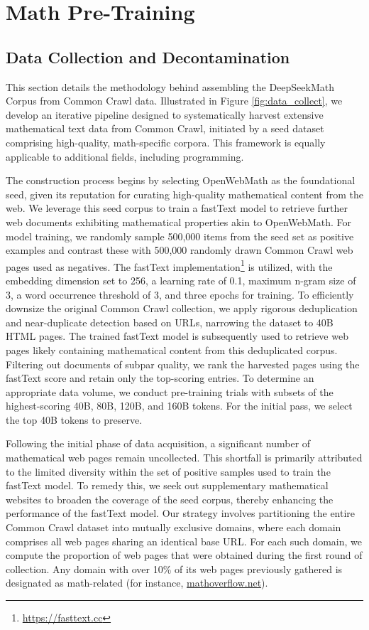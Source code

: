 \section{Math Pre-Training}

\subsection{Data Collection and Decontamination} This section details the methodology behind assembling the DeepSeekMath Corpus from Common Crawl data. Illustrated in Figure \ref{fig:data_collect}, we develop an iterative pipeline designed to systematically harvest extensive mathematical text data from Common Crawl, initiated by a seed dataset comprising high-quality, math-specific corpora. This framework is equally applicable to additional fields, including programming.

The construction process begins by selecting OpenWebMath \citep{openwebmath} as the foundational seed, given its reputation for curating high-quality mathematical content from the web. We leverage this seed corpus to train a fastText model \citep{joulin2016fasttext} to retrieve further web documents exhibiting mathematical properties akin to OpenWebMath. For model training, we randomly sample 500,000 items from the seed set as positive examples and contrast these with 500,000 randomly drawn Common Crawl web pages used as negatives. The fastText implementation\footnote{\url{https://fasttext.cc}} is utilized, with the embedding dimension set to 256, a learning rate of 0.1, maximum n-gram size of 3, a word occurrence threshold of 3, and three epochs for training. To efficiently downsize the original Common Crawl collection, we apply rigorous deduplication and near-duplicate detection based on URLs, narrowing the dataset to 40B HTML pages. The trained fastText model is subsequently used to retrieve web pages likely containing mathematical content from this deduplicated corpus. Filtering out documents of subpar quality, we rank the harvested pages using the fastText score and retain only the top-scoring entries. To determine an appropriate data volume, we conduct pre-training trials with subsets of the highest-scoring 40B, 80B, 120B, and 160B tokens. For the initial pass, we select the top 40B tokens to preserve.

Following the initial phase of data acquisition, a significant number of mathematical web pages remain uncollected. This shortfall is primarily attributed to the limited diversity within the set of positive samples used to train the fastText model. To remedy this, we seek out supplementary mathematical websites to broaden the coverage of the seed corpus, thereby enhancing the performance of the fastText model. Our strategy involves partitioning the entire Common Crawl dataset into mutually exclusive domains, where each domain comprises all web pages sharing an identical base URL. For each such domain, we compute the proportion of web pages that were obtained during the first round of collection. Any domain with over 10\% of its web pages previously gathered is designated as math-related (for instance, \url{mathoverflow.net}).


